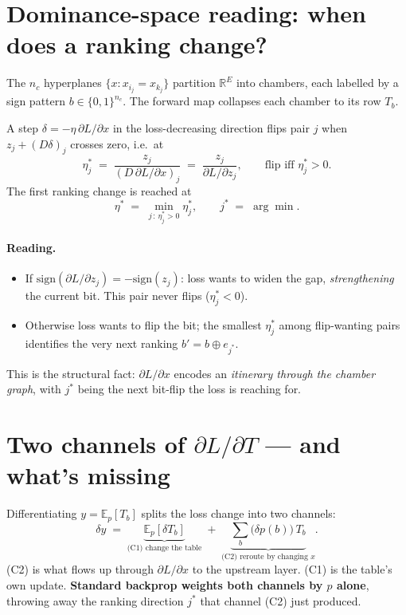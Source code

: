 \documentclass[11pt]{article}
\newcommand{\R}{\mathbb{R}}
\newcommand{\E}{\mathbb{E}}
\newcommand{\sign}{\mathrm{sign}}
\begin{document}
\section{Dominance-space reading: when does a ranking change?}
\label{sec:rank}

The $n_c$ hyperplanes $\{x : x_{i_j} = x_{k_j}\}$ partition $\R^E$ into chambers, each labelled by a sign pattern $b \in \{0,1\}^{n_c}$. The forward map collapses each chamber to its row $T_b$.

A step $\delta = -\eta\, \partial L / \partial x$ in the loss-decreasing direction flips pair $j$ when $z_j + (D \delta)_j$ crosses zero, i.e.\ at
\[
\eta^*_j \;=\; \frac{z_j}{(D\, \partial L / \partial x)_j} \;=\; \frac{z_j}{\partial L / \partial z_j}, \qquad \text{flip iff } \eta^*_j > 0.
\]
The first ranking change is reached at
\[
\eta^* \;=\; \min_{j\, :\, \eta^*_j > 0} \eta^*_j, \qquad j^* \;=\; \arg\min.
\]

\paragraph{Reading.}
\begin{itemize}
\setlength{\itemsep}{1pt}
    \item If $\sign(\partial L / \partial z_j) = -\sign(z_j)$: loss wants to widen the gap, \emph{strengthening} the current bit. This pair never flips ($\eta^*_j < 0$).
    \item Otherwise loss wants to flip the bit; the smallest $\eta^*_j$ among flip-wanting pairs identifies the very next ranking $b' = b \oplus e_{j^*}$.
\end{itemize}
This is the structural fact: $\partial L / \partial x$ encodes an \emph{itinerary through the chamber graph}, with $j^*$ being the next bit-flip the loss is reaching for.

\section{Two channels of $\partial L / \partial T$ --- and what's missing}
\label{sec:channels}

Differentiating $y = \E_p[T_b]$ splits the loss change into two channels:
\[
\delta y \;=\; \underbrace{\E_p\!\left[\delta T_b\right]}_{\text{(C1) change the table}} \;+\; \underbrace{\sum_b \big(\delta p(b)\big)\, T_b}_{\text{(C2) reroute by changing }x}.
\]
(C2) is what flows up through $\partial L / \partial x$ to the upstream layer. (C1) is the table's own update. \textbf{Standard backprop weights both channels by $p$ alone}, throwing away the ranking direction $j^*$ that channel (C2) just produced.
\end{document}
